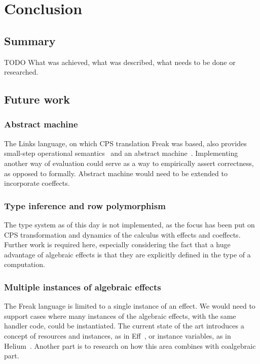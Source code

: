 \documentclass[declaration,shortabstract]{iithesis}
\theoremstyle{definition} \newtheorem{definition}{Definition}[chapter]
\theoremstyle{remark} \newtheorem{remark}[definition]{Observation}
\theoremstyle{plain} \newtheorem{theorem}[definition]{Theorem}
\theoremstyle{plain} \newtheorem{lemma}[definition]{Lemma}
\begin{document}
\chapter{Conclusion}\label{chapter:conclusion}
\section{Summary}

    TODO What was achieved, what was described, what needs to be done or researched.

\section{Future work}

    \subsection{Abstract machine}

    The Links language, on which CPS translation Freak was based, also provides
    small-step operational semantics~\cite{handlers-cps} and an abstract
    machine~\cite{liberating-effects}. Implementing another way of evaluation
    could serve as a way to empirically assert correctness, as opposed to formally.
    Abstract machine would need to be extended to incorporate coeffects.

    \subsection{Type inference and row polymorphism}

    The type system as of this day is not implemented, as the focus has been put
    on CPS transformation and dynamics of the calculus with effects and coeffects.
    Further work is required here, especially considering the fact that a huge
    advantage of algebraic effects is that they are explicitly defined in the
    type of a computation.

    \subsection{Multiple instances of algebraic effects}

    The Freak language is limited to a single instance of an effect. We would
    need to support cases where many instances of the algebraic effects, with
    the same handler code, could be instantiated. The current state of the
    art introduces a concept of resources and instances, as in Eff~\cite{programming-in-eff},
    or instance variables, as in Helium~\cite{binders-labels}. Another part is
    to research on how this area combines with coalgebraic part.
\end{document}
